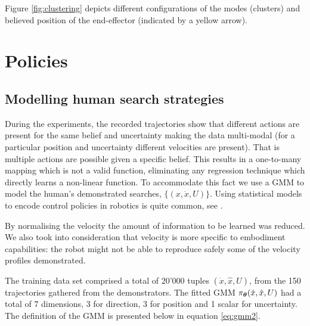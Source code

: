 Figure \ref{fig:clustering} depicts different configurations of the modes (clusters) and believed position of the end-effector (indicated by a yellow arrow).  





\section{Policies}\label{chap3:policies}

\subsection{Modelling human search strategies}\label{chap3:GMM_policy}

During the experiments, the recorded trajectories show that different actions are present for the same belief and uncertainty making the data multi-modal
(for a particular position and uncertainty different velocities are present). That is multiple actions are possible given a specific belief. 
This results in a one-to-many mapping which is not a valid function, eliminating any regression technique which directly learns a non-linear function. 
To accommodate this fact we use a GMM to model the human's demonstrated searches, $\{(x,\dot{x},U)\}$. 
Using statistical models to encode control policies in robotics is quite common, see \cite{Billard08chapter}. 

By normalising the velocity the amount of information to be learned was reduced. We also took into consideration that velocity is more 
specific to embodiment capabilities: the robot might not be able to reproduce safely some of the velocity profiles demonstrated. 

The training data set comprised a total of 20'000 tuples $(\dot{x},\hat{x},U)$, from the 150 trajectories gathered from the demonstrators. 
The fitted GMM $\pi_{\boldsymbol{\theta}}(\dot{x},\hat{x},U)$ had a total of 7 dimensions, 3 for direction, 3 for position and 1 scalar for uncertainty. 
The definition of the GMM is presented below in equation \ref{eq:gmm2}.


